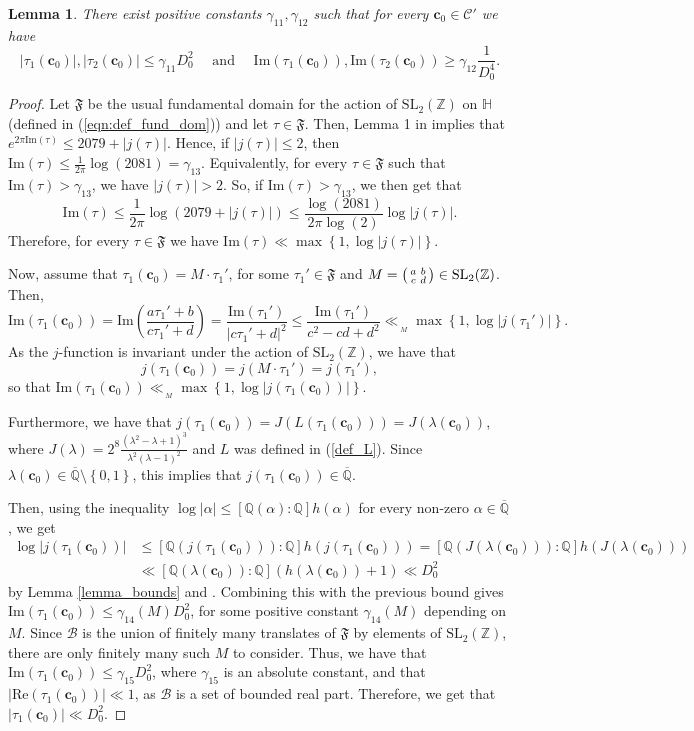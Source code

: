 \documentclass[11pt,a4paper,reqno]{amsart}
\numberwithin{equation}{section}
\newcommand{\Z}{\mathbb{Z}}
\newcommand{\Q}{\mathbb{Q}}
\newcommand{\Qal}{\overline{\mathbb{Q}}}
\renewcommand{\c}{\mathcal{C}}
\newcommand{\cc}{\mathbf{c}}
\renewcommand{\a}{\alpha}
\newcommand{\g}{\gamma}
\renewcommand{\l}{\lambda}
\newcommand{\pt}[1]{\left( #1 \right)}
\newcommand{\pq}[1]{\left[ #1 \right]}
\newcommand{\pg}[1]{\left\lbrace #1 \right\rbrace}
\newcommand{\abs}[1]{\left| #1 \right|}
\renewcommand{\Im}{\mathrm{Im}}
\renewcommand{\Re}{\mathrm{Re}}
\newtheorem{lemma}[theorem]{Lemma}
\theoremstyle{remark}
\theoremstyle{definition}
\theoremstyle{definition}
\begin{document}
\begin{lemma}\label{lemma_tau}
There exist positive constants $\g_{11}, \g_{12}$ such that for every $\cc_0 \in \c'$ we have
$$\lvert \tau_1(\cc_0) \rvert, \lvert \tau_2(\cc_0) \rvert \leq \g_{11} D_0^{2} \quad \text{ and } \quad \Im(\tau_1(\cc_0)), \Im(\tau_2(\cc_0)) \geq \g_{12} \dfrac{1}{D_0^4}.$$
\end{lemma}
\begin{proof}
Let $\mathfrak{F}$ be the usual fundamental domain for the action of $\mathrm{SL}_2(\Z)$ on $\mathbb{H}$ (defined in (\ref{eqn:def_fund_dom})) and let $\tau \in \mathfrak{F}$. Then, Lemma 1 in \cite{BMZ13} implies that $e^{2 \pi \Im(\tau)} \leq 2079+\abs{j(\tau)}$. Hence, if $\abs{j(\tau)}\leq 2$, then $\Im(\tau)\leq \frac{1}{2\pi}\log(2081)=\g_{13}$. Equivalently, for every $\tau \in \mathfrak{F}$ such that $\Im(\tau)>\g_{13}$, we have $\abs{j(\tau)}>2$.
So, if $\Im(\tau)> \g_{13}$, we then get that 
$$\Im(\tau)\leq \dfrac{1}{2\pi}\log\pt{2079+\abs{j(\tau)}}\leq \dfrac{\log(2081)}{2\pi \log(2)}\log\abs{j(\tau)}.$$
Therefore, for every $\tau \in \mathfrak{F}$ we have $\Im(\tau) \ll \max\pg{1, \log\abs{j(\tau)}}$.

Now, assume that $\tau_1(\cc_0)=M \cdot \tau_1'$, for some $\tau_1' \in \mathfrak{F}$ and $M=\begin{psmallmatrix}
a & b \\ 
c & d
\end{psmallmatrix}\in \mathrm{SL}_2(\Z)$. Then,
$$\Im(\tau_1(\cc_0))=\Im\!\pt{\dfrac{a \tau_1'+b}{c \tau_1'+d}}=\dfrac{\Im(\tau_1')}{\abs{c\tau_1'+d}^2}\leq \dfrac{\Im(\tau_1')}{c^2-cd+d^2}\ll_{\,\!{}_{M}} \max\pg{1, \log\abs{j(\tau_1')}}.$$
As the $j$-function is invariant under the action of $\mathrm{SL}_2(\Z)$, we have that 
$$j(\tau_1(\cc_0))=j(M \cdot \tau_1') =j(\tau_1'),$$
so that $\Im(\tau_1(\cc_0))\ll_{\,\!{}_{M}} \max\pg{1, \log\abs{j(\tau_1(\cc_0))}}$.

Furthermore, we have that $j(\tau_1(\cc_0))=J(L(\tau_1(\cc_0)))=J(\l(\cc_0))$, where $J(\l)=2^8 \frac{(\l^2-\l+1)^3}{\l^2 (\l-1)^2}$ and $L$ was defined in (\ref{def_L}). Since $\l(\cc_0) \in \Qal\setminus\pg{0,1}$, this implies that $j(\tau_1(\cc_0)) \in \Qal$.

Then, using the inequality $\log \abs{\a} \leq \pq{\Q(\a):\Q} h(\a)$ for every non-zero $\a \in \Qal$, we get
\begin{align*}
\log\abs{j(\tau_1(\cc_0))}&\leq \pq{\Q(j(\tau_1(\cc_0))):\Q} h(j(\tau_1(\cc_0)))=\pq{\Q(J(\l(\cc_0))):\Q} h(J(\l(\cc_0)))\\
&\ll \pq{\Q(\l(\cc_0)):\Q} (h(\l(\cc_0))+1) \ll D_0^{2} 
\end{align*}
by Lemma \ref{lemma_bounds} and \cite[Proposition 3.2]{Zan14}.
Combining this with the previous bound gives $\Im(\tau_1(\cc_0))\leq \g_{14}(M) D_0^{2}$, for some positive constant $\g_{14}(M)$ depending on $M$. Since $\mathcal{B}$ is the union of finitely many translates of $\mathfrak{F}$ by elements of $\mathrm{SL}_2(\Z)$, there are only finitely many such $M$ to consider. Thus, we have that $\Im(\tau_1(\cc_0))\leq \g_{15} D_0^{2}$, where $\g_{15}$ is an absolute constant, and that $\abs{\Re(\tau_1(\cc_0))} \ll 1$, as $\mathcal{B}$ is a set of bounded real part. Therefore, we get that $\abs{\tau_1(\cc_0)} \ll D_0^2$.


\end{proof}
\end{document}
